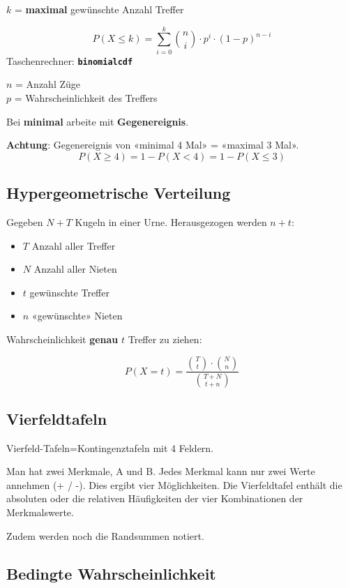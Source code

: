 \begin{multicols}{2}
\begin{tcolorbox}[colback=white]

$k$ = \textbf{maximal} gewünschte Anzahl Treffer


$$P(X\le k) = \sum_{i=0}^{k}{n \choose i}\cdot{}p^i\cdot{}(1-p)^{n-i}$$
Taschenrechner: \textbf{\texttt{binomialcdf}}

$n$ = Anzahl Züge\\
$p$ = Wahrscheinlichkeit des Treffers\\
\end{tcolorbox}


Bei \textbf{minimal} arbeite mit \textbf{Gegenereignis}.

\textbf{Achtung}: Gegenereignis von «minimal 4 Mal» = «maximal 3 Mal».
$$P(X \ge 4) = 1 - P(X < 4) = 1-P(X\le 3)$$

\forceCB
\subsection*{Hypergeometrische Verteilung}
Gegeben $N+T$ Kugeln in einer Urne. Herausgezogen werden $n+t$:
\begin{itemize}
\item $T$ Anzahl aller Treffer
\item $N$ Anzahl aller Nieten
\item $t$ gewünschte Treffer
\item $n$ «gewünschte» Nieten
\end{itemize}
Wahrscheinlichkeit \textbf{genau} $t$ Treffer zu ziehen:

$$P(X=t) = \frac{ {T \choose t} \cdot {N  \choose n} }{{T+N \choose t+n}}$$


\subsection*{Vierfeldtafeln}
Vierfeld-Tafeln=Kontingenztafeln mit 4 Feldern.

Man hat zwei Merkmale, A und B. Jedes Merkmal kann nur zwei Werte
annehmen (+ / -). Dies ergibt vier Möglichkeiten. Die Vierfeldtafel
enthält die absoluten oder die relativen Häufigkeiten der vier
Kombinationen der Merkmalswerte.

Zudem werden noch die Randsummen notiert.



\subsection*{Bedingte Wahrscheinlichkeit}


\end{multicols}
